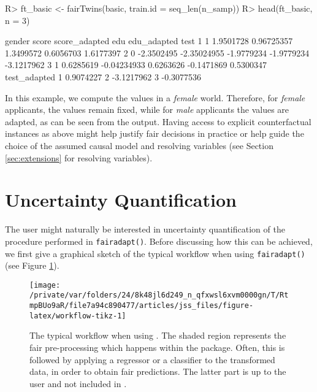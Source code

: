 \documentclass[
  nojss]{jss}
\begin{document}
\begin{CodeChunk}
\begin{CodeInput}
R> ft_basic <- fairTwins(basic, train.id = seq_len(n_samp))
R> head(ft_basic, n = 3)
\end{CodeInput}
\begin{CodeOutput}
  gender      score score_adapted        edu edu_adapted       test
1      1  1.9501728    0.96725357  1.3499572   0.6056703  1.6177397
2      0 -2.3502495   -2.35024955 -1.9779234  -1.9779234 -3.1217962
3      1  0.6285619   -0.04234933  0.6263626  -0.1471869  0.5300347
  test_adapted
1    0.9074227
2   -3.1217962
3   -0.3077536
\end{CodeOutput}
\end{CodeChunk}

In this example, we compute the values in a \emph{female} world.
Therefore, for \emph{female} applicants, the values remain fixed, while
for \emph{male} applicants the values are adapted, as can be seen from
the output. Having access to explicit counterfactual instances as above
might help justify fair decisions in practice or help guide the choice
of the assumed causal model and resolving variables (see Section
\ref{sec:extensions} for resolving variables).

\hypertarget{sec:uncq}{%
\section{Uncertainty Quantification}\label{sec:uncq}}

The user might naturally be interested in uncertainty quantification of
the procedure performed in \texttt{fairadapt()}. Before discussing how
this can be achieved, we first give a graphical sketch of the typical
workflow when using \texttt{fairadapt()} (see Figure
\ref{fig:workflow-tikz}).

\begin{CodeChunk}
\begin{figure}

{\centering \texttt{[image: /private/var/folders/24/8k48jl6d249\_n\_qfxwsl6xvm0000gn/T/RtmpBUo9aR/file7a94c890477/articles/jss\_files/figure-latex/workflow-tikz-1]} 

}

\caption{The typical workflow when using . The shaded region represents the fair pre-processing which happens within the  package. Often, this is followed by applying a regressor or a classifier to the transformed data, in order to obtain fair predictions. The latter part is up to the user and not included in .}\label{fig:workflow-tikz}
\end{figure}
\end{CodeChunk}
\end{document}
